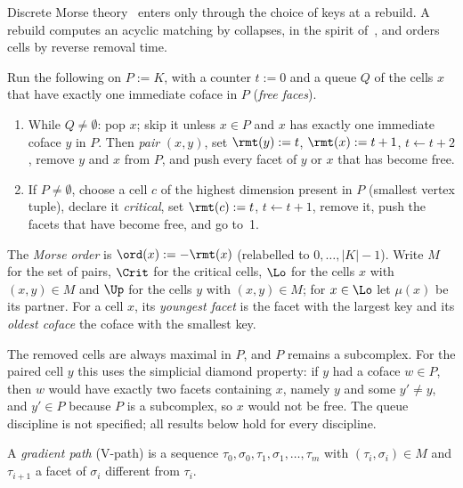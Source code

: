 Discrete Morse theory~\cite{forman2002user} enters only through the choice of
keys at a rebuild. A rebuild computes an acyclic matching by collapses, in the
spirit of~\cite{benedetti2014random}, and orders cells by reverse removal time.

\begin{definition}\label{def:collapse}
Run the following on $P:=K$, with a counter $t:=0$ and a queue $Q$ of the cells
$x$ that have exactly one immediate coface in $P$ (\emph{free faces}).
\begin{enumerate}
\item While $Q\ne\emptyset$: pop $x$; skip it unless $x\in P$ and $x$ has
  exactly one immediate coface $y$ in $P$. Then \emph{pair} $(x,y)$, set
  $\rmt(y):=t$, $\rmt(x):=t+1$, $t\gets t+2$, remove $y$ and $x$ from $P$, and
  push every facet of $y$ or $x$ that has become free.
\item If $P\ne\emptyset$, choose a cell $c$ of the highest dimension present in
  $P$ (smallest vertex tuple), declare it \emph{critical}, set $\rmt(c):=t$,
  $t\gets t+1$, remove it, push the facets that have become free, and go to~1.
\end{enumerate}
The \emph{Morse order} is $\ord(x):=-\rmt(x)$ (relabelled to $0,\dots,|K|-1$).
Write $M$ for the set of pairs, $\Crit$ for the critical cells, $\Lo$ for the
cells $x$ with $(x,y)\in M$ and $\Up$ for the cells $y$ with $(x,y)\in M$; for
$x\in\Lo$ let $\mu(x)$ be its partner. For a cell $x$, its \emph{youngest facet}
is the facet with the largest key and its \emph{oldest coface} the coface with
the smallest key.
\end{definition}

The removed cells are always maximal in $P$, and $P$ remains a subcomplex. For
the paired cell $y$ this uses the simplicial diamond property: if $y$ had a
coface $w\in P$, then $w$ would have exactly two facets containing $x$, namely
$y$ and some $y'\ne y$, and $y'\in P$ because $P$ is a subcomplex, so $x$ would
not be free. The queue discipline is not specified; all results below hold for
every discipline.

A \emph{gradient path} (V-path) is a sequence $\tau_0,\sigma_0,\tau_1,\sigma_1,
\dots,\tau_m$ with $(\tau_i,\sigma_i)\in M$ and $\tau_{i+1}$ a facet of
$\sigma_i$ different from $\tau_i$.

